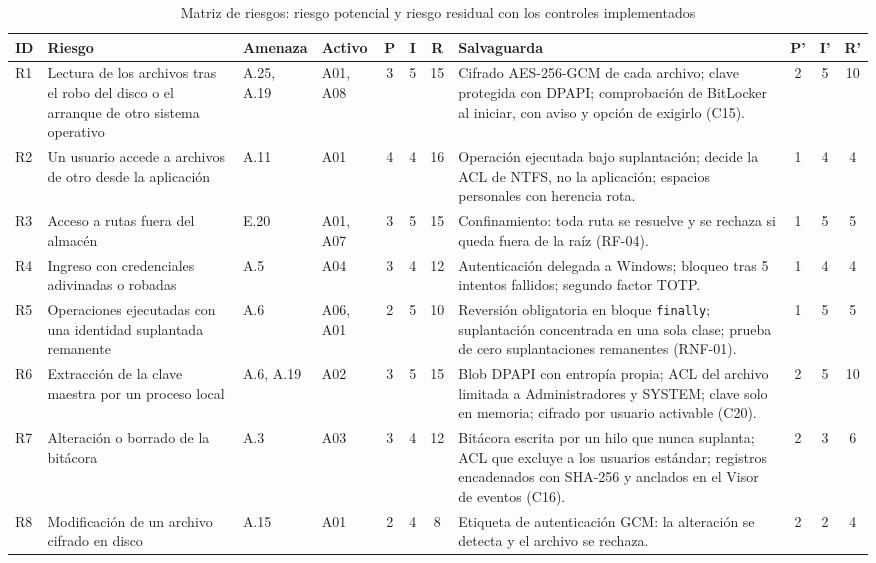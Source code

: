 \documentclass[conference]{IEEEtran}
\newcommand{\B}{\cellcolor{rbajo}}
\newcommand{\M}{\cellcolor{rmedio}}
\newcommand{\A}{\cellcolor{ralto}}
\newcommand{\C}{\cellcolor{rcritico}}
\begin{document}
\begin{table}[!t]
\caption{Matriz de riesgos: riesgo potencial y riesgo residual con los controles implementados}
\label{tab:riesgos}
\centering
\footnotesize
\setlength{\tabcolsep}{3pt}
\begin{tabular}{|l|p{4.6cm}|l|l|c|c|c|p{5.9cm}|c|c|c|}
\hline
\textbf{ID} & \textbf{Riesgo} & \textbf{Amenaza} & \textbf{Activo} & \textbf{P} & \textbf{I} & \textbf{R} & \textbf{Salvaguarda} & \textbf{P'} & \textbf{I'} & \textbf{R'} \\
\hline
R1 & Lectura de los archivos tras el robo del disco o el arranque de otro sistema operativo & A.25, A.19 & A01, A08 & 3 & 5 & \A 15 & Cifrado AES-256-GCM de cada archivo; clave protegida con DPAPI; comprobación de BitLocker al iniciar, con aviso y opción de exigirlo (C15). & 2 & 5 & \A 10 \\
\hline
R2 & Un usuario accede a archivos de otro desde la aplicación & A.11 & A01 & 4 & 4 & \C 16 & Operación ejecutada bajo suplantación; decide la ACL de NTFS, no la aplicación; espacios personales con herencia rota. & 1 & 4 & \B 4 \\
\hline
R3 & Acceso a rutas fuera del almacén & E.20 & A01, A07 & 3 & 5 & \A 15 & Confinamiento: toda ruta se resuelve y se rechaza si queda fuera de la raíz (RF-04). & 1 & 5 & \M 5 \\
\hline
R4 & Ingreso con credenciales adivinadas o robadas & A.5 & A04 & 3 & 4 & \A 12 & Autenticación delegada a Windows; bloqueo tras 5 intentos fallidos; segundo factor TOTP. & 1 & 4 & \B 4 \\
\hline
R5 & Operaciones ejecutadas con una identidad suplantada remanente & A.6 & A06, A01 & 2 & 5 & \A 10 & Reversión obligatoria en bloque \texttt{finally}; suplantación concentrada en una sola clase; prueba de cero suplantaciones remanentes (RNF-01). & 1 & 5 & \M 5 \\
\hline
R6 & Extracción de la clave maestra por un proceso local & A.6, A.19 & A02 & 3 & 5 & \A 15 & Blob DPAPI con entropía propia; ACL del archivo limitada a Administradores y SYSTEM; clave solo en memoria; cifrado por usuario activable (C20). & 2 & 5 & \A 10 \\
\hline
R7 & Alteración o borrado de la bitácora & A.3 & A03 & 3 & 4 & \A 12 & Bitácora escrita por un hilo que nunca suplanta; ACL que excluye a los usuarios estándar; registros encadenados con SHA-256 y anclados en el Visor de eventos (C16). & 2 & 3 & \M 6 \\
\hline
R8 & Modificación de un archivo cifrado en disco & A.15 & A01 & 2 & 4 & \M 8 & Etiqueta de autenticación GCM: la alteración se detecta y el archivo se rechaza. & 2 & 2 & \B 4 \\

\end{tabular}
\end{table}
\end{document}
